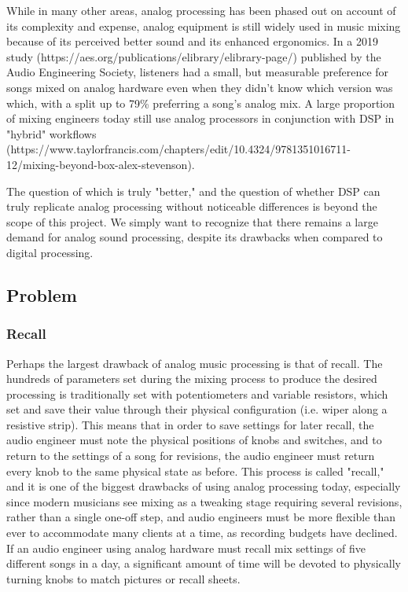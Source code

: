\documentclass[11pt, letterpaper,titlepage]{article}
\begin{document}
While in many other areas, analog processing has been phased out on account of its complexity and expense, analog equipment is still widely used in music mixing because of its perceived better sound and its enhanced ergonomics. In a 2019 study (https://aes.org/publications/elibrary/elibrary-page/) published by the Audio Engineering Society, listeners had a small, but measurable preference for songs mixed on analog hardware even when they didn't know which version was which, with a split up to 79\% preferring a song's analog mix. A large proportion of mixing engineers today still use analog processors in conjunction with DSP in "hybrid" workflows (https://www.taylorfrancis.com/chapters/edit/10.4324/9781351016711-12/mixing-beyond-box-alex-stevenson). 

The question of which is truly "better," and the question of whether DSP can truly replicate analog processing without noticeable differences is beyond the scope of this project. We simply want to recognize that there remains a large demand for analog sound processing, despite its drawbacks when compared to digital processing. 


\subsection{Problem}

\subsubsection{Recall}
Perhaps the largest drawback of analog music processing is that of recall. The hundreds of parameters set during the mixing process to produce the desired processing is traditionally set with potentiometers and variable resistors, which set and save their value through their physical configuration (i.e. wiper along a resistive strip). This means that in order to save settings for later recall, the audio engineer must note the physical positions of knobs and switches, and to return to the settings of a song for revisions, the audio engineer must return every knob to the same physical state as before. This process is called "recall," and it is one of the biggest drawbacks of using analog processing today, especially since modern musicians see mixing as a tweaking stage requiring several revisions, rather than a single one-off step, and audio engineers must be more flexible than ever to accommodate many clients at a time, as recording budgets have declined. If an audio engineer using analog hardware must recall mix settings of five different songs in a day, a significant amount of time will be devoted to physically turning knobs to match pictures or recall sheets.
\end{document}
